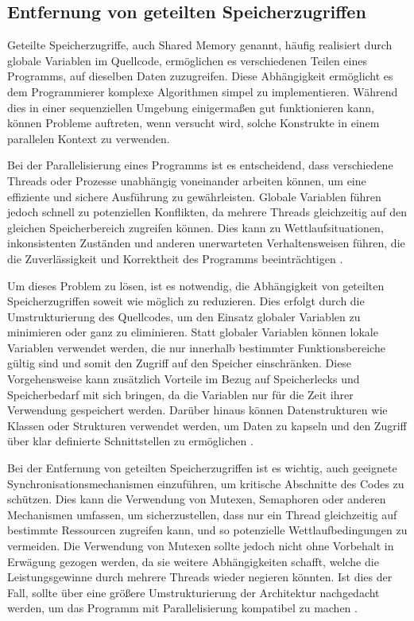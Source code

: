 \subsection{Entfernung von geteilten Speicherzugriffen}
\label{sec:Entfernung_geteilte_Speicherzugriffe}
Geteilte Speicherzugriffe, auch Shared Memory genannt, häufig realisiert durch globale Variablen im Quellcode, ermöglichen es verschiedenen Teilen eines Programms, auf dieselben Daten zuzugreifen. Diese Abhängigkeit ermöglicht es dem Programmierer komplexe Algorithmen simpel zu implementieren. Während dies in einer sequenziellen Umgebung einigermaßen gut funktionieren kann, können Probleme auftreten, wenn versucht wird, solche Konstrukte in einem parallelen Kontext zu verwenden.

Bei der Parallelisierung eines Programms ist es entscheidend, dass verschiedene Threads oder Prozesse unabhängig voneinander arbeiten können, um eine effiziente und sichere Ausführung zu gewährleisten. Globale Variablen führen jedoch schnell zu potenziellen Konflikten, da mehrere Threads gleichzeitig auf den gleichen Speicherbereich zugreifen können. Dies kann zu Wettlaufsituationen, inkonsistenten Zuständen und anderen unerwarteten Verhaltensweisen führen, die die Zuverlässigkeit und Korrektheit des Programms beeinträchtigen \citep{Czech_2017_Shared_Memory}.

Um dieses Problem zu lösen, ist es notwendig, die Abhängigkeit von geteilten Speicherzugriffen soweit wie möglich zu reduzieren. Dies erfolgt durch die Umstrukturierung des Quellcodes, um den Einsatz globaler Variablen zu minimieren oder ganz zu eliminieren. Statt globaler Variablen können lokale Variablen verwendet werden, die nur innerhalb bestimmter Funktionsbereiche gültig sind und somit den Zugriff auf den Speicher einschränken. Diese Vorgehensweise kann zusätzlich Vorteile im Bezug auf Speicherlecks und Speicherbedarf mit sich bringen, da die Variablen nur für die Zeit ihrer Verwendung gespeichert werden. Darüber hinaus können Datenstrukturen wie Klassen oder Strukturen verwendet werden, um Daten zu kapseln und den Zugriff über klar definierte Schnittstellen zu ermöglichen \citep{Czech_2017_Shared_Memory}.

Bei der Entfernung von geteilten Speicherzugriffen ist es wichtig, auch geeignete Synchronisationsmechanismen einzuführen, um kritische Abschnitte des Codes zu schützen. Dies kann die Verwendung von Mutexen, Semaphoren oder anderen Mechanismen umfassen, um sicherzustellen, dass nur ein Thread gleichzeitig auf bestimmte Ressourcen zugreifen kann, und so potenzielle Wettlaufbedingungen zu vermeiden. Die Verwendung von Mutexen sollte jedoch nicht ohne Vorbehalt in Erwägung gezogen werden, da sie weitere Abhängigkeiten schafft, welche die Leistungsgewinne durch mehrere Threads wieder negieren könnten. Ist dies der Fall, sollte über eine größere Umstrukturierung der Architektur nachgedacht werden, um das Programm mit Parallelisierung kompatibel zu machen \citep{Czech_2017_Shared_Memory}.

